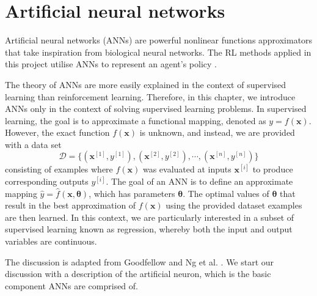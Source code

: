 \chapter{Artificial neural networks}\label{chp:anns}

Artificial neural networks (ANNs) are powerful nonlinear functions approximators that take inspiration from biological neural networks.
The RL methods applied in this project utilise ANNs to represent an agent's policy \cite{Fujimoto2018}.

The theory of ANNs are more easily explained in the context of supervised learning than reinforcement learning.
Therefore, in this chapter, we introduce ANNs only in the context of solving supervised learning problems.
In supervised learning, the goal is to approximate a functional mapping, denoted as $y=f(\bm{x})$.
However, the exact function $f(\bm{x})$ is unknown,  and instead, we are provided with a data set
\begin{equation}\label{eq:supdervised_dataset}
    \mathcal{D} = \{ (\bm{x}^{[1]}, y^{[1]}), (\bm{x}^{[2]}, y^{[2]}), \cdots, (\bm{x}^{[n]}, y^{[n]}) \}
\end{equation}
consisting of examples where $f(\bm{x})$ was evaluated at inputs $\bm{x}^{[i]}$ to produce corresponding outputs $y^{[i]}$.
The goal of an ANN is to define an approximate mapping $\hat{y}=\hat{f}(\bm{x},\bm{\theta})$, which has parameters $\bm{\theta}$.
The optimal values of $\bm{\theta}$ that result in the best approximation of $f(\bm{x})$ using the provided dataset examples \cite{Goodfellow2016} are then learned.
In this context, we are particularly interested in a subset of supervised learning known as regression, whereby both the input and output variables are continuous.

The discussion is adapted from Goodfellow \cite{Goodfellow2016} and Ng et al. \cite{Ng2019}. 
We start our discussion with a description of the artificial neuron, which is the basic component ANNs are comprised of.



